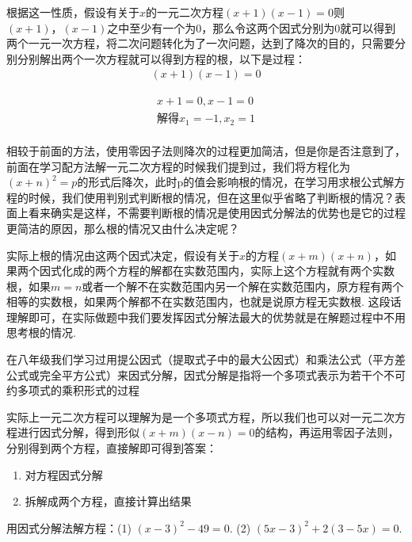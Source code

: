 \documentclass[lang=cn, 10pt, titlestyle=display, oneside, toc=twocol]{elegantbook}
\begin{document}
根据这一性质，假设有关于\(x\)的一元二次方程\((x+1)(x-1)=0\)则\((x+1)，(x-1)\)之中至少有一个为0，那么令这两个因式分别为0就可以得到两个一元一次方程，将二次问题转化为了一次问题，达到了降次的目的，只需要分别分别解出两个一次方程就可以得到方程的根，以下是过程：
\begin{align*}
    (x+1)(x-1)=0
\end{align*}
\begin{solution}
    \begin{align*}
        x+1=0, x-1=0\\
        解得x_1=-1,x_2=1\\
    \end{align*}
\end{solution}
相较于前面的方法，使用零因子法则降次的过程更加简洁，但是你是否注意到了，前面在学习配方法解一元二次方程的时候我们提到过，我们将方程化为\((x+n)^2=p\)的形式后降次，此时p的值会影响根的情况，在学习用求根公式解方程的时候，我们使用判别式判断根的情况，但在这里似乎省略了判断根的情况？表面上看来确实是这样，不需要判断根的情况是使用因式分解法的优势也是它的过程更简洁的原因，那么根的情况又由什么决定呢？
\par
实际上根的情况由这两个因式决定，假设有关于\(x\)的方程\((x+m)(x+n)\)，如果两个因式化成的两个方程的解都在实数范围内，实际上这个方程就有两个实数根，如果\(m=n\)或者一个解不在实数范围内另一个解在实数范围内，原方程有两个相等的实数根，如果两个解都不在实数范围内，也就是说原方程无实数根. 这段话理解即可，在实际做题中我们要发挥因式分解法最大的优势就是在解题过程中不用思考根的情况.

在八年级我们学习过用提公因式（提取式子中的最大公因式）和乘法公式（平方差公式或完全平方公式）来因式分解，因式分解是指将一个多项式表示为若干个不可约多项式的乘积形式的过程
\par
实际上一元二次方程可以理解为是一个多项式方程，所以我们也可以对一元二次方程进行因式分解，得到形似\((x+m)(x-n)=0\)的结构，再运用零因子法则，分别得到两个方程，直接解即可得到答案：

\begin{enumerate}
    \item 对方程因式分解
    \item 拆解成两个方程，直接计算出结果
\end{enumerate}



\begin{example}
    用因式分解法解方程：(1) \((x-3)^2-49=0\). (2) \((5x-3)^2+2(3-5x)=0\).
\end{example}
\end{document}
